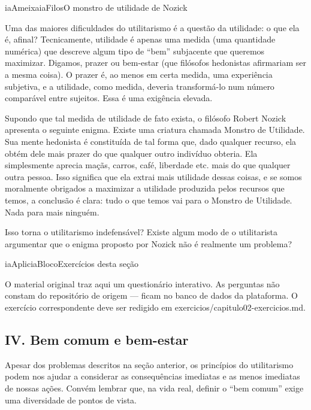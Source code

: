 \documentclass[
  11pt,
]{article}
\renewcommand{\texttt}[1]{{\color{iaAmeixa}\small\ttfamily #1}}
\newenvironment{filosofia}[1][Conceito filosofico]{\begin{iabox}{iaAmeixa}{iaFilos}{#1}}{\end{iabox}}
\newenvironment{reflexao}[1][Para pensar]{\begin{iabox}{iaAplic}{iaBloco}{#1}}{\end{iabox}}
\begin{document}
\begin{filosofia}[O monstro de utilidade de Nozick]

Uma das maiores dificuldades do utilitarismo é a questão da utilidade: o
que ela é, afinal? Tecnicamente, utilidade é apenas uma medida (uma
quantidade numérica) que descreve algum tipo de ``bem'' subjacente que
queremos maximizar. Digamos, prazer ou bem-estar (que filósofos
hedonistas afirmariam ser a mesma coisa). O prazer é, ao menos em certa
medida, uma experiência subjetiva, e a utilidade, como medida, deveria
transformá-lo num número comparável entre sujeitos. Essa é uma exigência
elevada.

Supondo que tal medida de utilidade de fato exista, o filósofo Robert
Nozick apresenta o seguinte enigma. Existe uma criatura chamada Monstro
de Utilidade. Sua mente hedonista é constituída de tal forma que, dado
qualquer recurso, ela obtém dele mais prazer do que qualquer outro
indivíduo obteria. Ela simplesmente aprecia maçãs, carros, café,
liberdade etc. mais do que qualquer outra pessoa. Isso significa que ela
extrai mais utilidade dessas coisas, e se somos moralmente obrigados a
maximizar a utilidade produzida pelos recursos que temos, a conclusão é
clara: tudo o que temos vai para o Monstro de Utilidade. Nada para mais
ninguém.

Isso torna o utilitarismo indefensável? Existe algum modo de o
utilitarista argumentar que o enigma proposto por Nozick não é realmente
um problema?

\end{filosofia}

\begin{reflexao}[Exercícios desta seção]

O material original traz aqui um questionário interativo. As perguntas
não constam do repositório de origem --- ficam no banco de dados da
plataforma. O exercício correspondente deve ser redigido em
\texttt{exercicios/capitulo02-exercicios.md}.

\end{reflexao}

\subsection{IV. Bem comum e bem-estar}\label{iv.-bem-comum-e-bem-estar}

Apesar dos problemas descritos na seção anterior, os princípios do
utilitarismo podem nos ajudar a considerar as consequências imediatas e
as menos imediatas de nossas ações. Convém lembrar que, na vida real,
definir o ``bem comum'' exige uma diversidade de pontos de vista.
\end{document}
